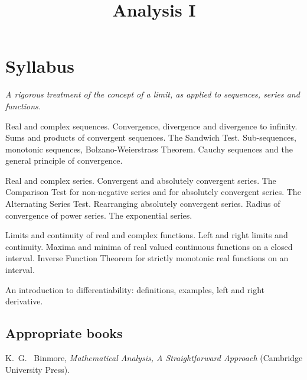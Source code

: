 \documentclass[twoside]{scrartcl}
\title{Analysis I}
\begin{document}
{

\section*{Syllabus}  

\textit{A rigorous treatment of the concept of a limit, as applied to sequences, series and functions.}

\vspace*{-5pt}
Real and complex sequences. Convergence, divergence and divergence to infinity. Sums and products of convergent sequences. The Sandwich Test. Sub-sequences, monotonic sequences, Bolzano-Weierstrass Theorem. Cauchy sequences and the general principle of convergence.

\vspace*{-5pt}
Real and complex series. Convergent and absolutely convergent series. The Comparison Test for non-negative series and for absolutely convergent series. The Alternating Series Test.  Rearranging absolutely convergent series. Radius of convergence of power series. The exponential series.

\vspace*{-5pt}
Limits and continuity of real and complex functions. Left and right limits and continuity. Maxima
and minima of real valued continuous functions on a closed interval. Inverse Function Theorem for
strictly monotonic real functions on an interval. 

\vspace*{-5pt}
 An introduction to differentiability: definitions, examples, left and right derivative.

\subsection*{Appropriate books}

{\shortskip

K.~G.~ Binmore, \textit{Mathematical Analysis, A Straightforward Approach} (Cambridge University Press).

}

}

\TableofContents

\pagebreak
\setcounter{section}{-1}

\setcounter{lecture}{-1}
\end{document}
